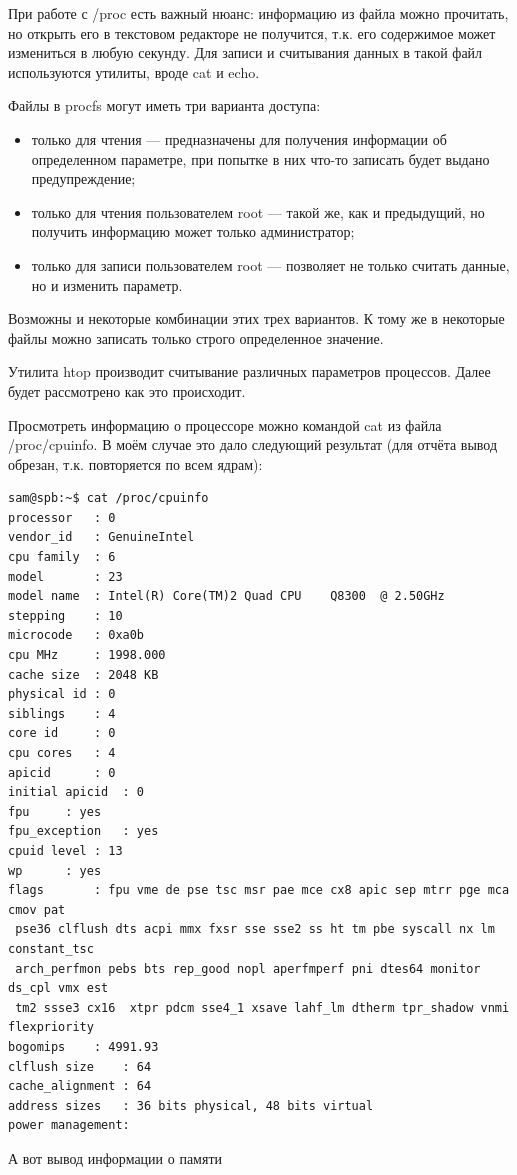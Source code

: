 \documentclass[a4paper, 12pt]{article}		%
\begin{document}
При работе с /proc есть важный нюанс: информацию  из  файла можно прочитать, но открыть его в текстовом редакторе не получится, т.к. его содержимое может измениться в любую секунду. Для записи  и  считывания данных в  такой  файл используются утилиты, вроде cat и echo.

Файлы в  procfs могут иметь три варианта доступа:
\begin{itemize}
\item только для чтения — предназначены для получения информации об определенном параметре, при попытке в них что-то записать будет выдано предупреждение;
\item только для чтения пользователем root — такой же, как и предыдущий, но получить информацию может только администратор;
\item только для записи  пользователем root — позволяет не только считать данные, но и  изменить параметр.
\end{itemize}

Возможны и  некоторые комбинации  этих трех вариантов.  К тому же в  некоторые файлы можно записать только строго определенное значение.\cite{Yamchuk}

Утилита htop производит считывание различных параметров процессов. Далее будет рассмотрено как это происходит.

Просмотреть информацию о процессоре можно командой cat из файла /proc/cpuinfo. В моём случае это дало следующий результат (для отчёта вывод обрезан, т.к. повторяется по всем ядрам):

\begin{verbatim}
sam@spb:~$ cat /proc/cpuinfo 
processor	: 0
vendor_id	: GenuineIntel
cpu family	: 6
model		: 23
model name	: Intel(R) Core(TM)2 Quad CPU    Q8300  @ 2.50GHz
stepping	: 10
microcode	: 0xa0b
cpu MHz		: 1998.000
cache size	: 2048 KB
physical id	: 0
siblings	: 4
core id		: 0
cpu cores	: 4
apicid		: 0
initial apicid	: 0
fpu		: yes
fpu_exception	: yes
cpuid level	: 13
wp		: yes
flags		: fpu vme de pse tsc msr pae mce cx8 apic sep mtrr pge mca cmov pat
 pse36 clflush dts acpi mmx fxsr sse sse2 ss ht tm pbe syscall nx lm constant_tsc
 arch_perfmon pebs bts rep_good nopl aperfmperf pni dtes64 monitor ds_cpl vmx est
 tm2 ssse3 cx16  xtpr pdcm sse4_1 xsave lahf_lm dtherm tpr_shadow vnmi flexpriority
bogomips	: 4991.93
clflush size	: 64
cache_alignment	: 64
address sizes	: 36 bits physical, 48 bits virtual
power management:
\end{verbatim}

А вот вывод информации о памяти
\end{document}
